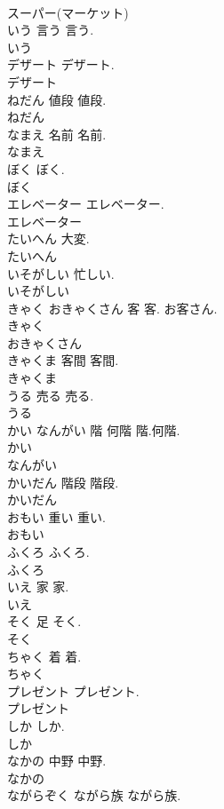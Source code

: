 \documentclass[8pt]{extreport}
\begin{document}
\begin{CJK}{UTF8}{min}
\\	スーパー(マーケット)
\\	いう	言う	言う.	
\\	いう
\\	デザート		デザート.	
\\	デザート
\\	ねだん	値段	値段.	
\\	ねだん
\\	なまえ	名前	名前.	
\\	なまえ
\\	ぼく		ぼく.	
\\	ぼく
\\	エレベーター		エレベーター.	
\\	エレベーター
\\	たいへん		大変.	
\\	たいへん
\\	いそがしい		忙しい.	
\\	いそがしい
\\	きゃく おきゃくさん	客	客. お客さん.	
\\	きゃく
\\	おきゃくさん
\\	きゃくま	客間	客間.	
\\	きゃくま
\\	うる	売る	売る.	
\\	うる
\\	かい なんがい	階 何階	階.何階.	
\\	かい
\\	なんがい
\\	かいだん	階段	階段.	
\\	かいだん
\\	おもい	重い	重い.	
\\	おもい
\\	ふくろ		ふくろ.	
\\	ふくろ
\\	いえ	家	家.	
\\	いえ
\\	そく	足	そく.	
\\	そく
\\	ちゃく	着	着.	
\\	ちゃく
\\	プレゼント		プレゼント.	
\\	プレゼント
\\	しか		しか.	
\\	しか
\\	なかの	中野	中野.	
\\	なかの
\\	ながらぞく	ながら族	ながら族.	

\end{CJK}
\end{document}
